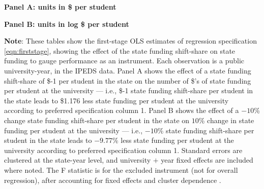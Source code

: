 \begin{table}[!htp]
    \singlespacing
    \centering
    \caption{First-Stage Estimates, Predicting State Funding by Funding Shift-Share, in IPEDS Data.}
    \textbf{Panel A: units in \$ per student}
    
    \makebox[\textwidth][c]{}
    
    \textbf{Panel B: units in log \$ per student}
    
    \makebox[\textwidth][c]{}

    \label{tab:firststage-reg}
    \justify
    \footnotesize
    \textbf{Note}:
    These tables show the first-stage OLS estimates of regression specification \eqref{eqn:firststage}, showing the effect of the state funding shift-share on state funding to gauge performance as an instrument.
    Each observation is a public university-year, in the IPEDS data.
    Panel A shows the effect of a state funding shift-share of \$-1 per student in the state on the number of \$'s of state funding per student at the university --- i.e.,
    \$-1 state funding shift-share per student in the state leads to \$1.176 less state funding per student at the university according to preferred specification column 1.
    Panel B shows the effect of a $-10$\% change state funding shift-share per student in the state on $10$\% change in state funding per student at the university --- i.e.,
    $-10$\% state funding shift-share per student in the state leads to $-9.77$\% less state funding per student at the university according to preferred specification column 1.        
    Standard errors are clustered at the state-year level, and university $+$ year fixed effects are included where noted.
    The F statistic is for the excluded instrument (not for overall regression), after accounting for fixed effects and cluster dependence \citep{olea2013robust}.
\end{table}


